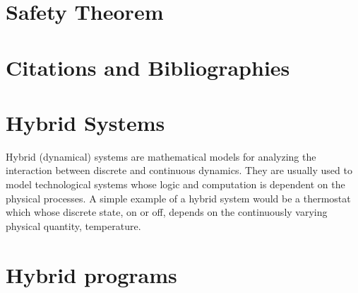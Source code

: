 \documentclass[sigconf,screen]{acmart}
\begin{document}
\section{Safety Theorem}


\section{Citations and Bibliographies}

%

%



% 
\appendix

\section{Hybrid Systems}
Hybrid (dynamical) systems are mathematical models for analyzing the interaction between discrete and continuous dynamics. They are usually used to model technological systems whose logic and computation is dependent on the physical processes. A simple example of a hybrid system would be a thermostat which whose discrete state, on or off, depends on the continuously varying physical quantity, temperature.

\section{Hybrid programs}
\end{document}
